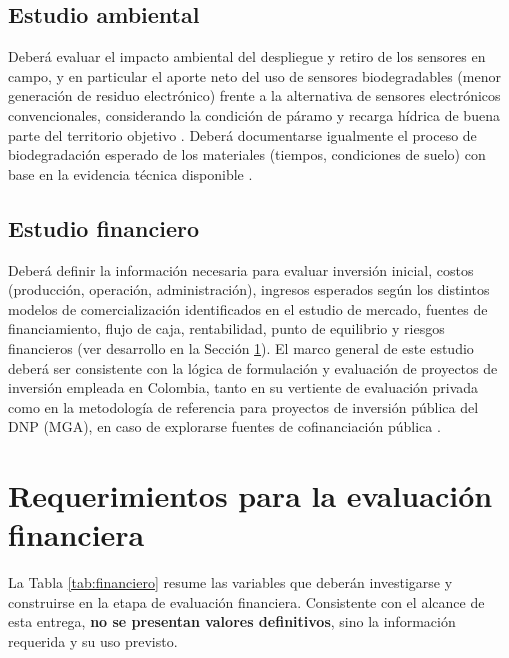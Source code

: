 \documentclass[11pt,a4paper]{article}
\begin{document}
\subsection{Estudio ambiental}
Deberá evaluar el impacto ambiental del despliegue y retiro de los sensores en campo, y en particular el aporte neto del uso de sensores biodegradables (menor generación de residuo electrónico) frente a la alternativa de sensores electrónicos convencionales, considerando la condición de páramo y recarga hídrica de buena parte del territorio objetivo \citep{corpoboyaca_paramo,corpoboyaca_car_paramo}. Deberá documentarse igualmente el proceso de biodegradación esperado de los materiales (tiempos, condiciones de suelo) con base en la evidencia técnica disponible \citep{sciencedirect2024review,osaka_sf}.

\subsection{Estudio financiero}
Deberá definir la información necesaria para evaluar inversión inicial, costos (producción, operación, administración), ingresos esperados según los distintos modelos de comercialización identificados en el estudio de mercado, fuentes de financiamiento, flujo de caja, rentabilidad, punto de equilibrio y riesgos financieros (ver desarrollo en la Sección \ref{sec:financiero}). El marco general de este estudio deberá ser consistente con la lógica de formulación y evaluación de proyectos de inversión empleada en Colombia, tanto en su vertiente de evaluación privada \citep{sapag2011} como en la metodología de referencia para proyectos de inversión pública del DNP (MGA), en caso de explorarse fuentes de cofinanciación pública \citep{dnp_mga2023}.

\section{Requerimientos para la evaluación financiera}
\label{sec:financiero}

La Tabla \ref{tab:financiero} resume las variables que deberán investigarse y construirse en la etapa de evaluación financiera. Consistente con el alcance de esta entrega, \textbf{no se presentan valores definitivos}, sino la información requerida y su uso previsto.
\end{document}
